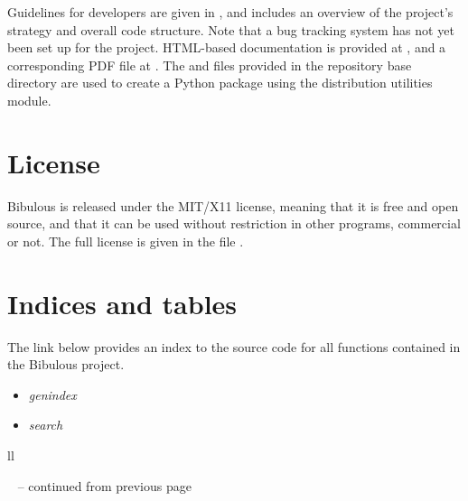 \documentclass[letterpaper,10pt,english]{sphinxmanual}
\begin{document}
Guidelines for developers are given in , and includes an overview of the project's strategy and overall code structure. Note that a bug tracking system has not yet been set up for the project. HTML-based documentation is provided at , and a corresponding PDF file at . The  and  files provided in the repository base directory are used to create a Python package using the  distribution utilities module.


\section{License}
\label{index:license}
Bibulous is released under the MIT/X11 license, meaning that it is free and open source, and that it can be used without restriction in other programs, commercial or not. The full license is given in the file .


\section{Indices and tables}
\label{index:indices-and-tables}
The link below provides an index to the source code for all functions contained in the Bibulous project.
\begin{itemize}
\item {} 
\emph{genindex}

\item {} 
\emph{search}

\end{itemize}

\begin{longtable}{ll}
\hline
\endfirsthead

%
{{\textsf{\tablename\ \thetable{} -- continued from previous page}}} \\
\hline
\endhead

\hline {} \\ \hline
\endfoot

\endlastfoot

\end{longtable}




\renewcommand{\indexname}{Index}
\printindex
\end{document}
